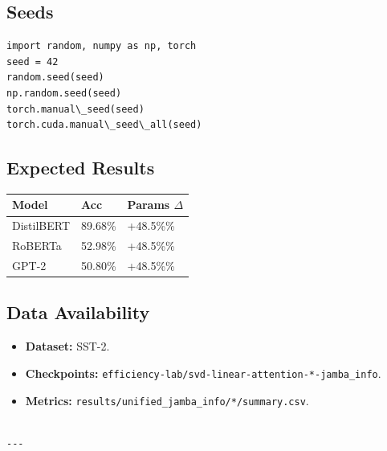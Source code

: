 \subsection{Seeds}

\begin{lstlisting}
import random, numpy as np, torch
seed = 42
random.seed(seed)
np.random.seed(seed)
torch.manual\_seed(seed)
torch.cuda.manual\_seed\_all(seed)
\end{lstlisting}

\subsection{Expected Results}

\begin{table}[H]
\centering
\small
\begin{tabular}{lll}
\toprule
\textbf{Model} & \textbf{Acc} & \textbf{Params $\Delta$} \\
\midrule
DistilBERT & 89.68\% & +48.5\%\% \\
RoBERTa & 52.98\% & +48.5\%\% \\
GPT-2 & 50.80\% & +48.5\%\% \\
\bottomrule
\end{tabular}
\end{table}

\subsection{Data Availability}

\begin{itemize}
\item \textbf{Dataset:} SST-2.
\item \textbf{Checkpoints:} \texttt{efficiency-lab/svd-linear-attention-*-jamba\_info}.
\item \textbf{Metrics:} \texttt{results/unified\_jamba\_info/*/summary.csv}.
\end{itemize}
\begin{lstlisting}

---
\end{lstlisting}